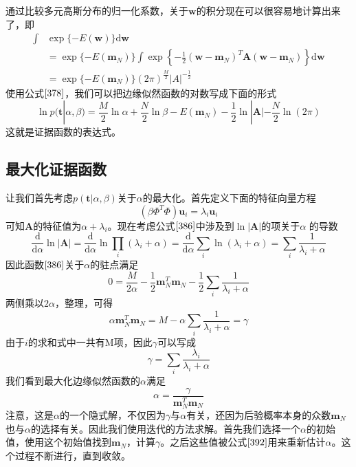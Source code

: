 通过比较多元高斯分布的归一化系数，关于$\boldsymbol{w}$的积分现在可以很容易地计算出来了，即
\begin{equation}
	\begin{aligned}
		\int &\exp\{-E(\boldsymbol{w})\}\mathrm{d}\boldsymbol{w}\\
		&=\exp\{-E(\boldsymbol{m}_N)\}\int \exp\left\{-\frac{1}{2}(\boldsymbol{w}-\boldsymbol{m}_N)^T\boldsymbol{A}(\boldsymbol{w}-\boldsymbol{m}_N) \right\}\mathrm{d}\boldsymbol{w}\\
		&=\exp\{-E(\boldsymbol{m}_N)\}(2\pi)^{\frac{M}{2}}|A|^{-\frac{1}{2}}
	\end{aligned}
\end{equation}
使用公式$\ref{378}$，我们可以把边缘似然函数的对数写成下面的形式
\begin{equation}
\label{386}
	\ln p(\boldsymbol{t}|\alpha,\beta)=\frac{M}{2}\ln \alpha +\frac{N}{2}\ln \beta - E(\boldsymbol{m}_N)-\frac{1}{2}\ln |\boldsymbol{A}|-\frac{N}{2}\ln (2\pi)
\end{equation}
这就是证据函数的表达式。
\subsection*{最大化证据函数}
让我们首先考虑$p(\boldsymbol{t}|\alpha,\beta)$关于$\alpha$的最大化。首先定义下面的特征向量方程
\begin{equation}
\label{387}
	(\beta \Phi^T\Phi)\boldsymbol{u}_i=\lambda_i\boldsymbol{u}_i
\end{equation}
可知$\boldsymbol{A}$的特征值为$\alpha + \lambda_i$。现在考虑公式$\ref{386}$中涉及到$\ln|\boldsymbol{A}|$的项关于$\alpha$
的导数
\begin{equation}
	\frac{\mathrm{d}}{\mathrm{d} \alpha}\ln |\boldsymbol{A}|=\frac{\mathrm{d}}{\mathrm{d} \alpha}\ln\prod_{i}(\lambda_i+\alpha)=\frac{\mathrm{d}}{\mathrm{d} \alpha}\sum_i\ln (\lambda_i+\alpha)=\sum_i \frac{1}{\lambda_i+\alpha}
\end{equation}
因此函数$\ref{386}$关于$\alpha$的驻点满足 
\begin{equation}
	0=\frac{M}{2\alpha}-\frac{1}{2}\boldsymbol{m}_N^T\boldsymbol{m}_N-\frac{1}{2}\sum_i\frac{1}{\lambda_i+\alpha}
\end{equation}
两侧乘以$2\alpha$，整理，可得
\begin{equation}
	\alpha \boldsymbol{m}_N^T\boldsymbol{m}_N=M-\alpha \sum_i\frac{1}{\lambda_i+\alpha}=\gamma
\end{equation}
由于$i$的求和式中一共有M项，因此$\gamma$可以写成 
\begin{equation}
	\gamma=\sum_i\frac{\lambda_i}{\lambda_i+\alpha}
\end{equation}
我们看到最大化边缘似然函数的$\alpha$满足
\begin{equation}
\label{392}
	\alpha = \frac{\gamma}{\boldsymbol{m}_N^T\boldsymbol{m}_N}
\end{equation}
注意，这是$\alpha$的一个隐式解，不仅因为$\gamma$与$\alpha$有关，还因为后验概率本身的众数$\boldsymbol{m}_N$也与$\alpha$的选择有关。因此我们使用迭代的方法求解。首先我们选择一个$\alpha$的初始值，使用这个初始值找到$\boldsymbol{m}_N$，计算$\gamma$。之后这些值被公式$\ref{392}$用来重新估计$\alpha$。这个过程不断进行，直到收敛。


